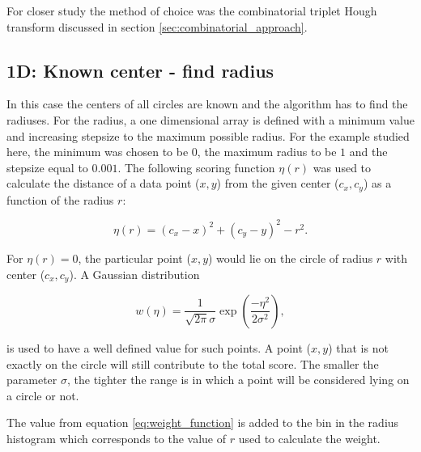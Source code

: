 \documentclass[11pt]{scrreprt}
\begin{document}
For closer study the 
method of choice was the combinatorial triplet Hough transform discussed in section \ref{sec:combinatorial_approach}.

\subsection{1D: Known center - find radius} %
\label{sub:1d_known_center_find_radius}

In this case the centers of all circles are known and the algorithm has to find the radiuses. For the radius, a one dimensional array is defined with a 
minimum value and increasing stepsize to the maximum possible radius. For the example studied here, the minimum was chosen to be $0$, 
the maximum radius to be $1$ and the stepsize equal to $0.001$. The following scoring function $\eta(r)$ was used to calculate the distance
of a data point ($x,y$) from the given center ($c_x, c_y$) as a function of the radius $r$:

\begin{equation}
\label{eq:score_function}
  \eta(r) = (c_x - x)^2 + (c_y - y)^2 - r ^ 2.
\end{equation}

For $\eta(r)=0$, the particular point ($x,y$) would lie on the circle of radius $r$ with center ($c_x, c_y$).
A Gaussian distribution 

\begin{equation}
\label{eq:weight_function}
  w(\eta) = \frac{1}{\sqrt{2\pi}\sigma}\exp\left( \frac{-\eta^2}{2\sigma^2}\right),
\end{equation}

is used to have a well defined value for such points. A point ($x,y$) that is not exactly on the circle will still contribute to the total score. The smaller the parameter $\sigma$, the tighter the range is
in which a point will be considered lying on a circle or not.

The value from equation \ref{eq:weight_function} is added to the bin in the radius histogram which corresponds to the value of $r$ used to
calculate the weight.
\end{document}
